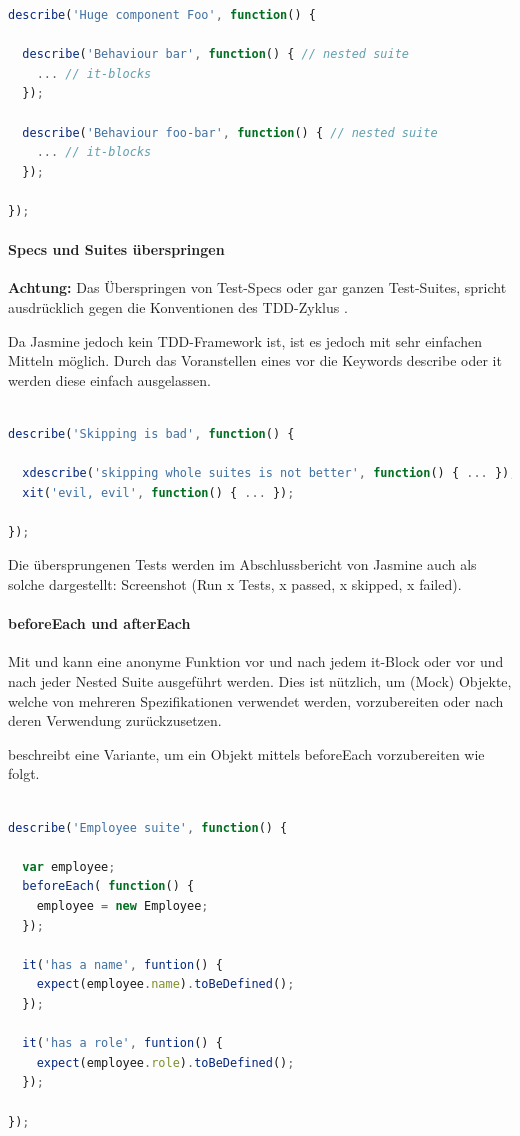 \begin{lstlisting}[language=JavaScript]
describe('Huge component Foo', function() {

  describe('Behaviour bar', function() { // nested suite
    ... // it-blocks
  });

  describe('Behaviour foo-bar', function() { // nested suite
    ... // it-blocks
  });

});
\end{lstlisting}

\paragraph{Specs und Suites überspringen}
\textbf{Achtung:} Das Überspringen von Test-Specs oder gar ganzen Test-Suites, spricht ausdrücklich gegen die Konventionen des TDD-Zyklus \autocite{Beck:2003}.

Da Jasmine jedoch kein TDD-Framework ist, ist es jedoch mit sehr einfachen Mitteln möglich. Durch das Voranstellen eines  vor die Keywords describe oder it werden diese einfach ausgelassen.

\begin{lstlisting}[language=JavaScript]

describe('Skipping is bad', function() {

  xdescribe('skipping whole suites is not better', function() { ... });
  xit('evil, evil', function() { ... });

});
\end{lstlisting}

Die übersprungenen Tests werden im Abschlussbericht von Jasmine auch als solche dargestellt:
Screenshot (Run x Tests, x passed, x skipped, x failed).

\paragraph{beforeEach und afterEach}

Mit  und  kann eine anonyme Funktion vor und nach jedem it-Block oder vor und nach jeder Nested Suite ausgeführt werden. Dies ist nützlich, um (Mock) Objekte, welche von mehreren Spezifikationen verwendet werden, vorzubereiten oder nach deren Verwendung zurückzusetzen.

\cite[23]{Hahn:2013} beschreibt eine Variante, um ein Objekt mittels beforeEach vorzubereiten wie folgt.
\begin{lstlisting}[language=JavaScript]

describe('Employee suite', function() {

  var employee;
  beforeEach( function() {
    employee = new Employee;
  });

  it('has a name', funtion() {
    expect(employee.name).toBeDefined();
  });

  it('has a role', funtion() {
    expect(employee.role).toBeDefined();
  });

});

\end{lstlisting}


